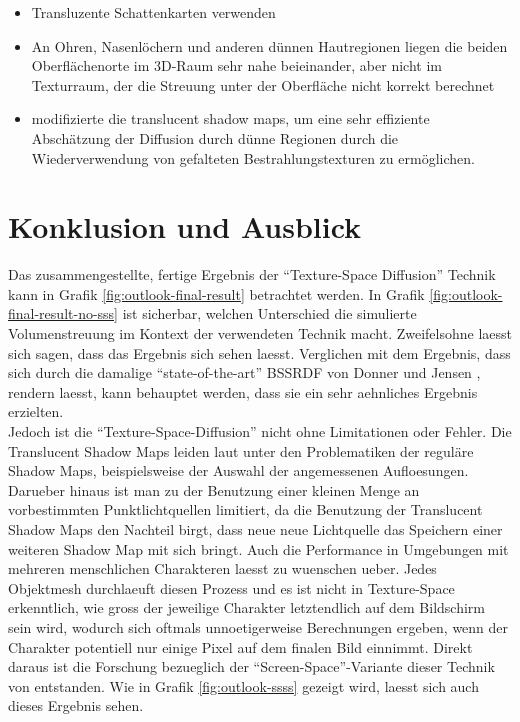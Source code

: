 \documentclass[ngerman,runningheads,a4paper]{llncs}[2018/03/10]
\begin{document}
\citet{translucent-shadow-maps}

\begin{itemize}
  \item Transluzente Schattenkarten verwenden
  \item An Ohren, Nasenlöchern und anderen dünnen Hautregionen liegen die beiden Oberflächenorte im 3D-Raum sehr nahe beieinander, aber nicht im Texturraum, der die Streuung unter der Oberfläche nicht korrekt berechnet
  \item \citet{efficient-human-skin-rendering} modifizierte die translucent shadow maps, um eine sehr effiziente Abschätzung der Diffusion durch dünne Regionen durch die Wiederverwendung von gefalteten Bestrahlungstexturen zu ermöglichen.
\end{itemize}

\section{Konklusion und Ausblick}
\label{sec:outlook}

Das zusammengestellte, fertige Ergebnis der \enquote{Texture-Space Diffusion} Technik kann in Grafik \ref{fig:outlook-final-result} betrachtet werden.
In Grafik \ref{fig:outlook-final-result-no-sss} ist sicherbar, welchen Unterschied die simulierte Volumenstreuung im Kontext der verwendeten Technik macht.
Zweifelsohne laesst sich sagen, dass das Ergebnis sich sehen laesst.
Verglichen mit dem Ergebnis, dass sich durch die damalige \enquote{state-of-the-art} BSSRDF von Donner und Jensen \cite{spectral-bssrdf-human-skin}, rendern laesst, kann behauptet werden, dass sie ein sehr aehnliches Ergebnis erzielten.
\\

Jedoch ist die \enquote{Texture-Space-Diffusion} nicht ohne Limitationen oder Fehler.
Die Translucent Shadow Maps leiden laut \citet{efficient-human-skin-rendering} unter den Problematiken der reguläre Shadow Maps, beispielsweise der Auswahl der angemessenen Aufloesungen.
Darueber hinaus ist man zu der Benutzung einer kleinen Menge an vorbestimmten Punktlichtquellen limitiert, da die Benutzung der Translucent Shadow Maps den Nachteil birgt, dass neue neue Lichtquelle das Speichern einer weiteren Shadow Map mit sich bringt.
Auch die Performance in Umgebungen mit mehreren menschlichen Charakteren laesst zu wuenschen ueber.
Jedes Objektmesh durchlaeuft diesen Prozess und es ist nicht in Texture-Space erkenntlich, wie gross der jeweilige Charakter letztendlich auf dem Bildschirm sein wird, wodurch sich oftmals unnoetigerweise Berechnungen ergeben, wenn der Charakter potentiell nur einige Pixel auf dem finalen Bild einnimmt.
Direkt daraus ist die Forschung bezueglich der \enquote{Screen-Space}-Variante dieser Technik von \citet{screen-space-subsurface} entstanden.
Wie in Grafik \ref{fig:outlook-ssss} gezeigt wird, laesst sich auch dieses Ergebnis sehen.
\end{document}
